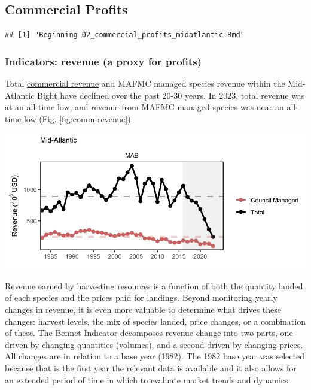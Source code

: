 \documentclass[
  10pt,
]{article}
\let\origfigure\figure
\let\endorigfigure\endfigure
\renewenvironment{figure}[1][2] {
    \expandafter\origfigure\expandafter[H]
} {
    \endorigfigure
}
\begin{document}
\subsection{Commercial Profits}\label{commercial-profits}

\begin{verbatim}
## [1] "Beginning 02_commercial_profits_midatlantic.Rmd"
\end{verbatim}

\subsubsection{Indicators: revenue (a proxy for profits)}\label{indicators-revenue-a-proxy-for-profits}

Total \href{https://noaa-edab.github.io/catalog/comdat.html}{commercial revenue} and MAFMC managed species revenue within the Mid-Atlantic Bight have declined over the past 20-30 years. In 2023, total revenue was at an all-time low, and revenue from MAFMC managed species was near an all-time low (Fig. \ref{fig:comm-revenue}).

\begin{figure}

{\centering \includegraphics{midatlantic_files/figure-latex/comm-revenue-1} 

}

\caption{Revenue for the for the Mid-Atlantic region: total (black) and from MAFMC managed species (red).}\label{fig:comm-revenue}
\end{figure}

Revenue earned by harvesting resources is a function of both the quantity landed of each species and the prices paid for landings. Beyond monitoring yearly changes in revenue, it is even more valuable to determine what drives these changes: harvest levels, the mix of species landed, price changes, or a combination of these. The \href{https://noaa-edab.github.io/catalog/bennet.html}{Bennet Indicator} decomposes revenue change into two parts, one driven by changing quantities (volumes), and a second driven by changing prices. All changes are in relation to a base year (1982). The 1982 base year was selected because that is the first year the relevant data is available and it also allows for an extended period of time in which to evaluate market trends and dynamics.
\end{document}
